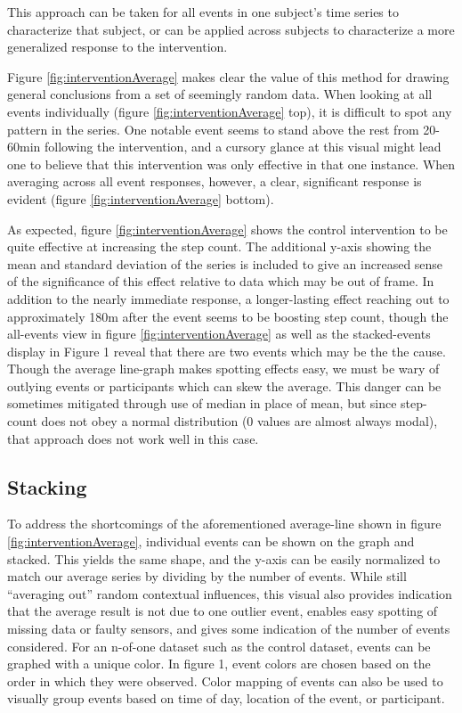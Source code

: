 This approach can be taken for all events in one subject's time series to characterize that subject, or can be applied across subjects to characterize a more generalized response to the intervention.

Figure \ref{fig:interventionAverage} makes clear the value of this method for drawing general conclusions from a set of seemingly random data.
When looking at all events individually (figure \ref{fig:interventionAverage} top), it is difficult to spot any pattern in the series.
One notable event seems to stand above the rest from 20-60min following the intervention, and a cursory glance at this visual might lead one to believe that this intervention was only effective in that one instance.
When averaging across all event responses, however, a clear, significant response is evident (figure \ref{fig:interventionAverage} bottom).

As expected, figure \ref{fig:interventionAverage} shows the control intervention to be quite effective at increasing the step count.
The additional y-axis showing the mean and standard deviation of the series is included to give an increased sense of the significance of this effect relative to data which may be out of frame.
In addition to the nearly immediate response, a longer-lasting effect reaching out to approximately 180m after the event seems to be boosting step count, though the all-events view in figure \ref{fig:interventionAverage} as well as the stacked-events display in Figure 1 reveal that there are two events which may be the the cause.
Though the average line-graph makes spotting effects easy, we must be wary of outlying events or participants which can skew the average.
This danger can be sometimes mitigated through use of median in place of mean, but since step-count does not obey a normal distribution (0 values are almost always modal), that approach does not work well in this case.

\subsection{Stacking}
To address the shortcomings of the aforementioned average-line shown in figure \ref{fig:interventionAverage}, individual events can be shown on the graph and stacked.
This yields the same shape, and the y-axis can be easily normalized to match our average series by dividing by the number of events.
While still “averaging out” random contextual influences, this visual also provides indication that the average result is not due to one outlier event, enables easy spotting of missing data or faulty sensors, and gives some indication of the number of events considered.
For an n-of-one dataset such as the control dataset, events can be graphed with a unique color.
In figure 1, event colors are chosen based on the order in which they were observed.
Color mapping of events can also be used to visually group events based on time of day, location of the event, or participant.

